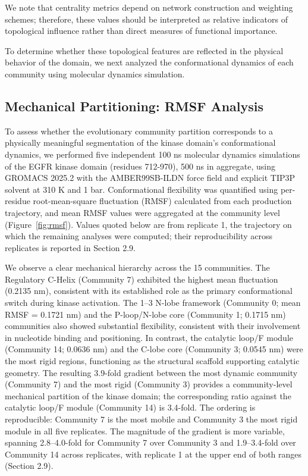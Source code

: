 \documentclass[utf8]{FrontiersinHarvard}
\begin{document}
We note that centrality metrics depend on network construction and weighting schemes; therefore, these values should be interpreted as relative indicators of topological influence rather than direct measures of functional importance.

To determine whether these topological features are reflected in the physical behavior of the domain, we next analyzed the conformational dynamics of each community using molecular dynamics simulation.

\subsection{Mechanical Partitioning: RMSF Analysis}

To assess whether the evolutionary community partition corresponds to a physically meaningful segmentation of the kinase domain's conformational dynamics, we performed five independent 100 ns molecular dynamics simulations of the EGFR kinase domain (residues 712-970), 500 ns in aggregate, using GROMACS 2025.2 \citep{Abraham2015} with the AMBER99SB-ILDN force field \citep{LindorffLarsen2010} and explicit TIP3P solvent \citep{Jorgensen1983} at 310 K and 1 bar. Conformational flexibility was quantified using per-residue root-mean-square fluctuation (RMSF) calculated from each production trajectory, and mean RMSF values were aggregated at the community level (Figure~\ref{fig:rmsf}). Values quoted below are from replicate 1, the trajectory on which the remaining analyses were computed; their reproducibility across replicates is reported in Section 2.9.

We observe a clear mechanical hierarchy across the 15 communities. The Regulatory \textalpha{}C-Helix (Community 7) exhibited the highest mean fluctuation (0.2135 nm), consistent with its established role as the primary conformational switch during kinase activation. The \textbeta{}1--\textbeta{}3 N-lobe framework (Community 0; mean RMSF = 0.1721 nm) and the P-loop/N-lobe core (Community 1; 0.1715 nm) communities also showed substantial flexibility, consistent with their involvement in nucleotide binding and positioning. In contrast, the catalytic loop/\textalpha{}F module (Community 14; 0.0636 nm) and the C-lobe core (Community 3; 0.0545 nm) were the most rigid regions, functioning as the structural scaffold supporting catalytic geometry. The resulting 3.9-fold gradient between the most dynamic community (Community 7) and the most rigid (Community 3) provides a community-level mechanical partition of the kinase domain; the corresponding ratio against the catalytic loop/\textalpha{}F module (Community 14) is 3.4-fold. The ordering is reproducible: Community 7 is the most mobile and Community 3 the most rigid module in all five replicates. The magnitude of the gradient is more variable, spanning 2.8--4.0-fold for Community 7 over Community 3 and 1.9--3.4-fold over Community 14 across replicates, with replicate 1 at the upper end of both ranges (Section 2.9).
\end{document}
